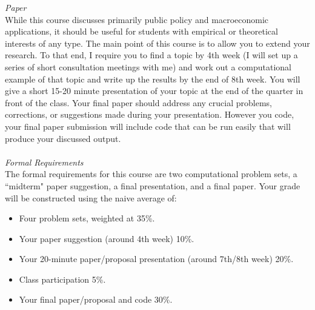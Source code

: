 \documentclass[a4paper]{article}
\begin{document}
\emph{Paper}\\
While this course discusses primarily public policy and macroeconomic applications, it should be useful for students with empirical or theoretical interests of any type.   The main point of this course is to allow you to extend your research.  To that end, I require you to find a topic by 4th week (I will set up a series of short consultation meetings with me) and work out a  computational example of that topic and write up the results by the end of 8th week.  You will give a short 15-20 minute presentation of your topic at the end of the quarter in front of the class.  Your final paper should address any crucial problems, corrections, or suggestions made during your presentation.  However you code, your final paper submission will include  code that can be run easily that will produce your discussed output.  \\
\ \\

\emph{Formal Requirements}\\
The formal requirements for this course are two computational problem sets, a ``midterm" paper suggestion, a final presentation, and a final paper.  Your grade will be constructed using the naive average of: \begin{itemize}
\item Four problem sets, weighted at 35\%.
\item Your paper suggestion (around 4th week) 10\%.
\item Your 20-minute paper/proposal presentation (around 7th/8th week) 20\%.
\item Class participation 5\%.
\item Your final paper/proposal and code 30\%.
\end{itemize}
\ \\
\end{document}
